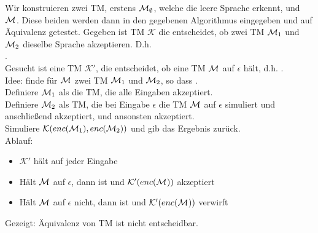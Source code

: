    \LOES Wir konstruieren zwei TM, erstens $\mathcal{M}_{\emptyset}$, welche die leere Sprache erkennt, und $\mathcal{M}_{}$. Diese beiden werden dann in den gegebenen Algorithmus eingegeben und auf Äquivalenz getestet.
    Gegeben ist TM $\mathcal{K}$ die entscheidet, ob zwei TM $\mathcal{M}_{1}$ und $\mathcal{M}_{2}$ dieselbe Sprache akzeptieren. D.h. \\
    . \\

    Gesucht ist eine TM $\mathcal{K}'$, die entscheidet, ob eine TM $\mathcal{M}_{}$ auf $\epsilon$ hält, d.h.
    . \\

    Idee: finde für $\mathcal{M}_{}$ zwei TM $\mathcal{M}_{1}$ und $\mathcal{M}_{2}$, so dass . \\
    Definiere $\mathcal{M}_{1}$ als die TM, die alle Eingaben akzeptiert. \\
    Definiere $\mathcal{M}_{2}$ als TM, die bei Eingabe $\epsilon$ die TM $\mathcal{M}_{}$ auf $\epsilon$ simuliert und anschließend akzeptiert, und ansonsten akzeptiert. \\
    Simuliere $\mathcal{K}(enc(\mathcal{M}_{1}), enc(\mathcal{M}_{2}))$ und gib das Ergebnis zurück. \\

    Ablauf:
    \begin{itemize}
        \item $\mathcal{K}'$ hält auf jeder Eingabe
        \item Hält $\mathcal{M}_{}$ auf $\epsilon$, dann ist  und $\mathcal{K}'(enc(\mathcal{M}_{}))$ akzeptiert
        \item Hält $\mathcal{M}_{}$ auf $\epsilon$ nicht, dann ist  und $\mathcal{K}'(enc(\mathcal{M}_{}))$ verwirft
    \end{itemize}

    Gezeigt: Äquivalenz von TM ist nicht entscheidbar.
